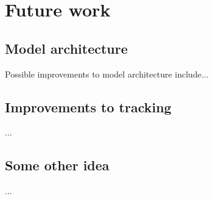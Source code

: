 \section{Future work}
\label{sec:conclusion/future_work}

\subsection{Model architecture}

Possible improvements to model architecture include...

\subsection{Improvements to tracking}

...

\subsection{Some other idea}

...
